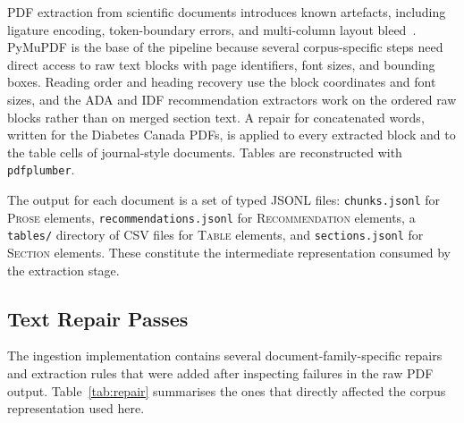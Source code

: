 PDF extraction from scientific documents introduces known artefacts,
including ligature encoding, token-boundary errors, and multi-column layout
bleed~\cite{bast2017}. PyMuPDF is the base of the pipeline because several
corpus-specific steps need direct access to raw text blocks with page
identifiers, font sizes, and bounding boxes. Reading order and heading
recovery use the block coordinates and font sizes, and the ADA and IDF
recommendation extractors work on the ordered raw blocks rather than on merged
section text. A repair for concatenated words, written for the Diabetes Canada
PDFs, is applied to every extracted block and to the table cells of
journal-style documents. Tables are reconstructed with \texttt{pdfplumber}.

The output for each document is a set of typed JSONL files:
\texttt{chunks.jsonl} for \textsc{Prose} elements,
\texttt{recommendations.jsonl} for \textsc{Recommendation} elements, a
\texttt{tables/} directory of CSV files for \textsc{Table} elements, and
\texttt{sections.jsonl} for \textsc{Section} elements. These constitute
the intermediate representation consumed by the extraction stage.

\subsection{Text Repair Passes}
\label{sec:exp_repair}

The ingestion implementation contains several document-family-specific
repairs and extraction rules that were added after inspecting failures in
the raw PDF output. Table~\ref{tab:repair} summarises the ones that directly
affected the corpus representation used here.

